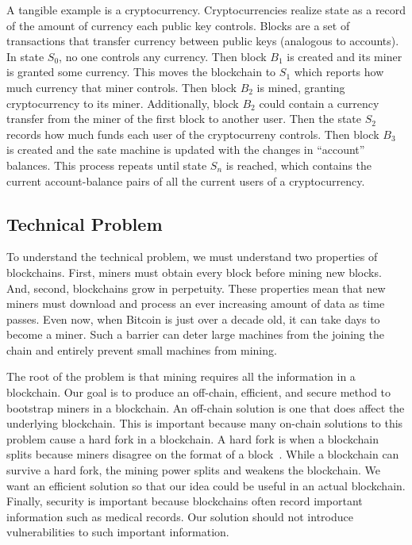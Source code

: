 A tangible example is a cryptocurrency.
Cryptocurrencies realize state as a record of the amount of currency each public key controls.
Blocks are a set of transactions that transfer currency between public keys (analogous to accounts).
In state $S_0$, no one controls any currency.
Then block $B_1$ is created and its miner is granted some currency.
This moves the blockchain to $S_1$ which reports how much currency that miner controls.
Then block $B_2$ is mined, granting cryptocurrency to its miner.
Additionally, block $B_2$ could contain a currency transfer from the miner of the first block to another user.
Then the state $S_2$ records how much funds each user of the cryptocurreny controls.
Then block $B_3$ is created and the sate machine is updated with the changes in ``account'' balances.
This process repeats until state $S_n$ is reached, which contains the current account-balance pairs of all the current users of a cryptocurrency.

\subsection{Technical Problem}

To understand the technical problem, we must understand two properties of blockchains.
First, miners must obtain every block before mining new blocks.
And, second, blockchains grow in perpetuity.
These properties mean that new miners must download and process an ever increasing amount of data as time passes.
Even now, when Bitcoin is just over a decade old, it can take days to become a miner. %
Such a barrier can deter large machines from the joining the chain and entirely prevent small machines from mining.

The root of the problem is that mining requires all the information in a blockchain.
Our goal is to produce an off-chain, efficient, and secure method to bootstrap miners in a blockchain.
An off-chain solution is one that does affect the underlying blockchain.
This is important because many on-chain solutions to this problem cause a hard fork in a blockchain.
A hard fork is when a blockchain splits because miners disagree on the format of a block~\cite{lin2017Survey}.
While a blockchain can survive a hard fork, the mining power splits and weakens the blockchain.
We want an efficient solution so that our idea could be useful in an actual blockchain.
Finally, security is important because blockchains often record important information such as medical records. 
Our solution should not introduce vulnerabilities to such important information.

